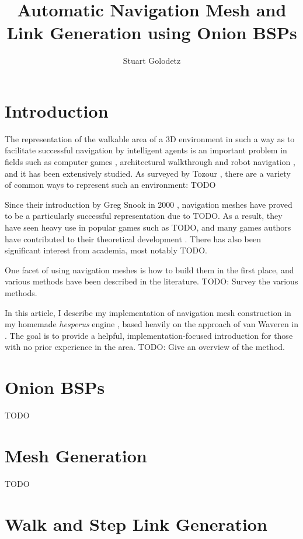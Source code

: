 \documentclass[12pt,onecolumn]{article}
\begin{document}
\title{Automatic Navigation Mesh and Link Generation using Onion BSPs}
\author{Stuart Golodetz}
\date{}
\maketitle

\section*{Introduction}

The representation of the walkable area of a 3D environment in such a way as to facilitate successful navigation by intelligent agents is an important problem in fields such as computer games \cite{?}, architectural walkthrough \cite{?} and robot navigation \cite{?}, and it has been extensively studied. As surveyed by Tozour \cite{tozour04}, there are a variety of common ways to represent such an environment: TODO

Since their introduction by Greg Snook in 2000 \cite{snook00}, navigation meshes have proved to be a particularly successful representation due to TODO. As a result, they have seen heavy use in popular games such as TODO, and many games authors have contributed to their theoretical development \cite{?}. There has also been significant interest from academia, most notably TODO.

One facet of using navigation meshes is how to build them in the first place, and various methods have been described in the literature. TODO: Survey the various methods.

In this article, I describe my implementation of navigation mesh construction in my homemade \emph{hesperus} engine \cite{?}, based heavily on the approach of van Waveren in \cite{?}. The goal is to provide a helpful, implementation-focused introduction for those with no prior experience in the area. TODO: Give an overview of the method.

\section*{Onion BSPs}

TODO

\section*{Mesh Generation}

TODO

\section*{Walk and Step Link Generation}
\end{document}

